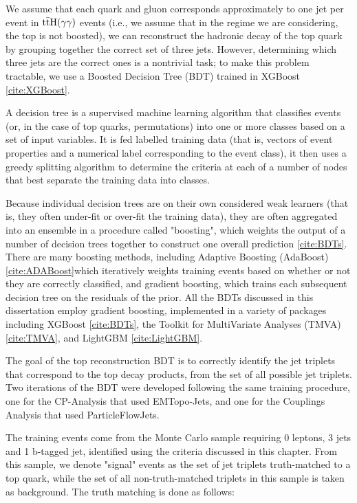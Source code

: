 We assume that each quark and gluon corresponds approximately to one jet per event in $\mathrm{t\bar{t}H}(\gamma \gamma)$ events (i.e., we assume that in the regime we are considering, the top is not boosted), we can reconstruct the hadronic decay of the top quark by grouping together the correct set of three jets. However, determining which three jets are the correct ones is a nontrivial task; to make this problem tractable, we use a Boosted Decision Tree (BDT) trained in XGBoost \ref{cite:XGBoost}.

A decision tree is a supervised machine learning algorithm that classifies events (or, in the case of top quarks, permutations) into one or more classes based on a set of input variables. It is fed labelled training data (that is, vectors of event properties and a numerical label corresponding to the event class), it then uses a greedy splitting algorithm to determine the criteria at each of a number of nodes that best separate the training data into classes.

Because individual decision trees are on their own considered weak learners (that is, they often under-fit or over-fit the training data), they are often aggregated into an ensemble in a procedure called "boosting", which weights the output of a number of decision trees together to construct one overall prediction \ref{cite:BDTs}. There are many boosting methods, including Adaptive Boosting (AdaBoost) \ref{cite:ADABoost}which iteratively weights training events based on whether or not they are correctly classified, and gradient boosting, which trains each subsequent decision tree on the residuals of the prior. All the BDTs discussed in this dissertation employ gradient boosting, implemented in a variety of packages including XGBoost \ref{cite:BDTs}, the Toolkit for MultiVariate Analyses (TMVA) \ref{cite:TMVA}, and LightGBM \ref{cite:LightGBM}.

The goal of the top reconstruction BDT is to correctly identify the jet triplets that correspond to the top decay products, from the set of all possible jet triplets. Two iterations of the BDT were developed following the same training procedure, one for the CP-Analysis that used EMTopo-Jets, and one for the Couplings Analysis that used ParticleFlowJets.

The training events come from the \ttH Monte Carlo sample requiring 0 leptons, 3 jets and 1 b-tagged jet, identified using the criteria discussed in this chapter. From this sample, we denote "signal" events as the set of jet triplets truth-matched to a top quark, while the set of all non-truth-matched triplets in this sample is taken as background. The truth matching is done as follows:

